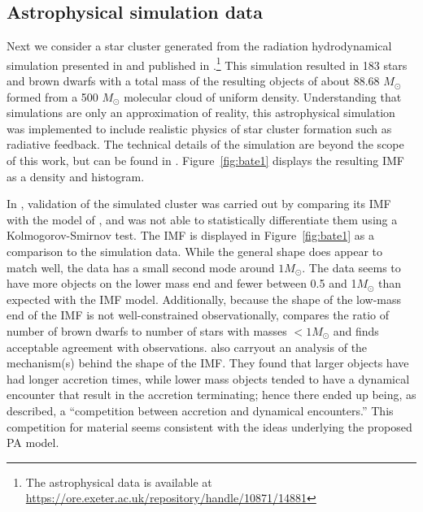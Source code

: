 \documentclass[ejs]{imsart}
\numberwithin{equation}{section}
\theoremstyle{plain}
\newcommand{\Msun}{M_{\odot}}
\begin{document}
\subsection{Astrophysical simulation data} \label{sec:bate}

Next we consider a star cluster generated from the radiation hydrodynamical simulation presented in \cite{Bate2012} and published in \cite{Bate2014}.\footnote{The astrophysical data is available at \url{https://ore.exeter.ac.uk/repository/handle/10871/14881}}  
This simulation resulted in 183 stars and brown dwarfs with a total mass of the resulting objects of about 88.68 $\Msun$ formed from a 500 $\Msun$ molecular cloud of uniform density.  
Understanding that simulations are only an approximation of reality, this astrophysical simulation was implemented to include realistic physics of star cluster formation such as radiative feedback. 
The technical details of the simulation are beyond the scope of this work, but can be found in \cite{Bate2012}.
Figure~\ref{fig:bate1} displays the resulting IMF as a density and histogram.
%

In \cite{Bate2012}, validation of the simulated cluster was carried out by comparing its IMF with the model of \cite{chabrier2005}, and was not able to statistically differentiate them using a Kolmogorov-Smirnov test.  The \cite{chabrier2005} IMF is displayed in Figure~\ref{fig:bate1} as a comparison to the simulation data.  While the general shape does appear to match well, the \cite{Bate2012} data has a small second mode around $1\Msun$.  The \cite{Bate2012} data seems to have more objects on the lower mass end and fewer between 0.5 and 1$\Msun$ than expected with the \cite{chabrier2005} IMF model.
%
Additionally, because the shape of the low-mass end of the IMF is not well-constrained observationally,  \cite{Bate2012} compares the ratio of number of brown dwarfs to number of stars with masses $<1\Msun$ and finds acceptable agreement with observations. 
%
\cite{Bate2012} also carryout an analysis of the mechanism(s) behind the shape of the IMF.  
They found that larger objects have had longer accretion times, while lower mass objects tended to have a dynamical encounter that result in the accretion terminating; hence there ended up being, as \cite{Bate2012} described, a ``competition between accretion and dynamical encounters.''  This competition for material seems consistent with the ideas underlying the proposed PA model.
\end{document}
